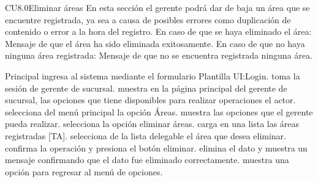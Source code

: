 

	\begin{UseCase}{CU8.0}{Eliminar áreas}{
		En esta sección el gerente podrá dar de baja un área que se encuentre registrada, ya sea a 				causa de posibles errores como duplicación de contenido o error a la hora del registro.
	}
		{
		En caso de que se haya eliminado el área:
		Mensaje de que el área ha sido eliminada exitosamente.
		En caso de que no haya ninguna área registrada:
		Mensaje de que no se encuentra registrada ninguna área.}

	\end{UseCase}

\begin{UCtrayectoria}{Principal}
		\UCpaso[\UCactor] ingresa al sistema mediante el formulario  Plantilla UI:Login.
		\UCpaso toma la sesión de gerente de sucursal.
		\UCpaso muestra en la página principal del gerente de sucursal, las opciones que tiene disponibles para realizar operaciones el actor. 
		\UCpaso[\UCactor] selecciona del menú principal la opción Áreas.
		\UCpaso muestra las opciones que el gerente pueda realizar.
		\UCpaso[\UCactor] selecciona la opción eliminar áreas.
		\UCpaso carga en una lista las áreas registradas [TA].
		\UCpaso[\UCactor] selecciona de la lista delegable el área que desea eliminar.
		\UCpaso[\UCactor] confirma la operación y presiona el botón eliminar.
		\UCpaso elimina el dato y muestra un mensaje confirmando que el dato fue eliminado correctamente.
		\UCpaso muestra una opción para regresar al menú de opciones. 
	\end{UCtrayectoria}